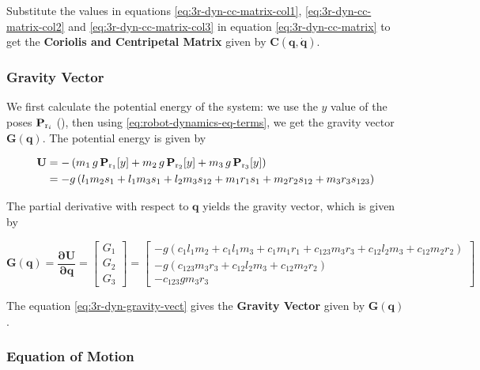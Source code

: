 \noindent
Substitute the values in equations \ref{eq:3r-dyn-cc-matrix-col1}, \ref{eq:3r-dyn-cc-matrix-col2} and \ref{eq:3r-dyn-cc-matrix-col3} in equation \ref{eq:3r-dyn-cc-matrix} to get the \textbf{Coriolis and Centripetal Matrix} given by $\mathbf{C(q, \dot{q})}$.

\subsubsection*{Gravity Vector}

We first calculate the potential energy of the system: we use the $y$ value of the poses $\mathbf{P}_{\textup{r}_i}$ (), then using \ref{eq:robot-dynamics-eq-terms}, we get the gravity vector $\mathbf{G(q)}$. The potential energy is given by

\begin{align}
    \mathbf{U} &= - \left ( m_1 \, g \, \mathbf{P}_{\textup{r}_1}[y] + m_2 \, g \, \mathbf{P}_{\textup{r}_2}[y] + m_3 \, g \, \mathbf{P}_{\textup{r}_3}[y] \right )
    \nonumber \\
    &= - g \left(l_{1} m_{2} s_{1} + l_{1} m_{3} s_{1} + l_{2} m_{3} s_{12} + m_{1} r_{1} s_{1} + m_{2} r_{2} s_{12} + m_{3} r_{3} s_{123}\right)
\end{align}

The partial derivative with respect to $\mathbf{q}$ yields the gravity vector, which is given by

\begin{equation}
    \mathbf{G(q)} = \mathbf{ \frac{\partial U}{\partial q}} = \begin{bmatrix}
        G_1 \\ G_2 \\ G_3
        \end{bmatrix} = \begin{bmatrix}
        - g \left(c_{1} l_{1} m_{2} + c_{1} l_{1} m_{3} + c_{1} m_{1} r_{1} + c_{123} m_{3} r_{3} + c_{12} l_{2} m_{3} + c_{12} m_{2} r_{2}\right) \\
        - g \left(c_{123} m_{3} r_{3} + c_{12} l_{2} m_{3} + c_{12} m_{2} r_{2}\right) \\
        - c_{123} g m_{3} r_{3}
        \end{bmatrix}
        \label{eq:3r-dyn-gravity-vect}
\end{equation}

\noindent
The equation \ref{eq:3r-dyn-gravity-vect} gives the \textbf{Gravity Vector} given by $\mathbf{G(q)}$.

\subsubsection*{Equation of Motion}

